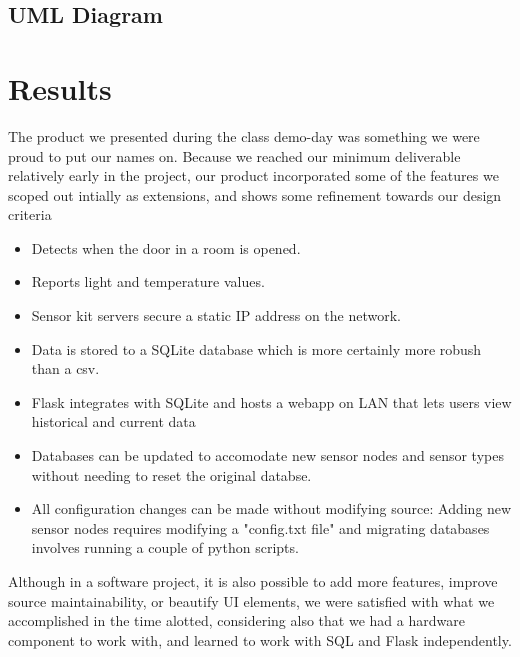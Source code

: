 \documentclass{article}
\begin{document}
\subsection*{UML Diagram}

\section*{Results}
\par The product we presented during the class demo-day was something we were proud to put our names on. Because we reached our minimum deliverable relatively early in the project, our product incorporated some of the features we scoped out intially as extensions, and shows some refinement towards our design criteria
\begin{itemize}
 \item Detects when the door in a room is opened.
 \item Reports light and temperature values.
 \item Sensor kit servers secure a static IP address on the network.
 \item Data is stored to a SQLite database which is more certainly more robush than a csv.
 \item Flask integrates with SQLite and hosts a webapp on LAN that lets users view historical and current data
 \item Databases can be updated to accomodate new sensor nodes and sensor types without needing to reset the original databse.
 \item All configuration changes can be made without modifying source: Adding new sensor nodes requires modifying a "config.txt file" and migrating databases involves running a couple of python scripts.
\end{itemize}
Although in a software project, it is also possible to add more features, improve source maintainability, or beautify UI elements, we were satisfied with what we accomplished in the time alotted, considering also that we had a hardware component to work with, and learned to work with SQL and Flask independently.
\end{document}
